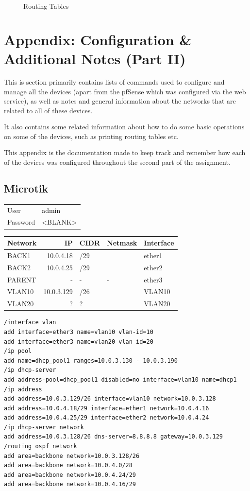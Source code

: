 \documentclass[11pt,parskip=half]{scrartcl}
\begin{document}
\begin{figure}[!ht]
	\centering
    \caption{Routing Tables}
\end{figure}

\section{Appendix: Configuration \& Additional Notes (Part II)}
This is section primarily contains lists of commands used to configure and manage
all the devices (apart from the pfSense which was configured via the web service),
as well as notes and general information about the networks that are related to all
of these devices. 

It also contains some related information about how to do some basic operations on some of the devices, such as printing routing tables etc.

This appendix is the documentation made to keep track and remember how each of the devices was configured throughout the second part of the assignment.

\subsection{{\bfseries\sffamily } Microtik}
\label{sec:org78e1204}

\begin{center}
\begin{tabular}{ll}
User & admin\\
Password & <BLANK>\\
\end{tabular}
\end{center}

\begin{center}
\begin{tabular}{lrlll}
Network & IP & CIDR & Netmask & Interface\\
\hline
BACK1 & 10.0.4.18 & /29 &  & ether1\\
BACK2 & 10.0.4.25 & /29 &  & ether2\\
PARENT & - & - & - & ether3\\
VLAN10 & 10.0.3.129 & /26 &  & VLAN10\\
VLAN20 & ? & ? &  & VLAN20\\
\end{tabular}
\end{center}

\begin{lstlisting}[basicstyle=\small, frame=single]
/interface vlan
add interface=ether3 name=vlan10 vlan-id=10
add interface=ether3 name=vlan20 vlan-id=20
/ip pool
add name=dhcp_pool1 ranges=10.0.3.130 - 10.0.3.190
/ip dhcp-server
add address-pool=dhcp_pool1 disabled=no interface=vlan10 name=dhcp1
/ip address
add address=10.0.3.129/26 interface=vlan10 network=10.0.3.128
add address=10.0.4.18/29 interface=ether1 network=10.0.4.16
add address=10.0.4.25/29 interface=ether2 network=10.0.4.24
/ip dhcp-server network
add address=10.0.3.128/26 dns-server=8.8.8.8 gateway=10.0.3.129
/routing ospf network
add area=backbone network=10.0.3.128/26
add area=backbone network=10.0.4.0/28
add area=backbone network=10.0.4.24/29
add area=backbone network=10.0.4.16/29
\end{lstlisting}
\end{document}
